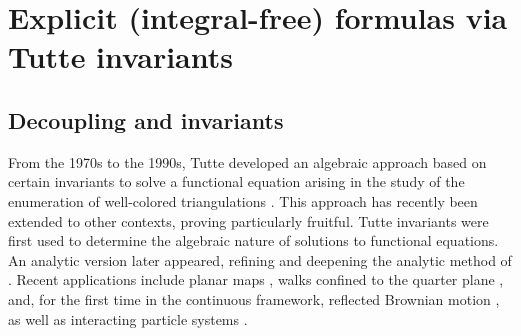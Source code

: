 \documentclass[11pt]{article}
\newcommand\citeS[1]{\cite{#1}}
\newcommand{\citet}[2][]{%
  \if\relax\detokenize{#1}\relax
    \cite{#2}%
  \else
    \cite[#1]{#2}%
  \fi
}
\theoremstyle{definition}
\begin{document}
\section{Explicit (integral-free) formulas via Tutte invariants}
\label{sec:explifor}

\subsection{Decoupling and invariants}
\label{sec:foncdecinv}

From the 1970s to the 1990s, Tutte developed an algebraic approach based on certain invariants to solve a functional equation arising in the study of the enumeration of well-colored triangulations \cite{Tutte-95}. 
This approach has recently been extended to other contexts, proving particularly fruitful. Tutte invariants were first used to determine the algebraic nature of solutions to functional equations. An analytic version later appeared, refining and deepening the analytic method of \citet{fayolle_random_2017}. Recent applications include planar maps \cite{albenque_menard_schaeffer,BeBM-11}, walks confined to the quarter plane \cite{bernardi_counting_2015}, and, for the first time in the continuous framework, reflected Brownian motion \citeS{franceschi_raschel_tutte_2017,franceschi_bousquet_melou_price_hardouin_raschel_stationary_2023}, as well as interacting particle systems \citeS{franceschi_ichiba_karatzas_raschel_degenerate_2024,franceschi_degenerate_asym_2025}.
\end{document}
